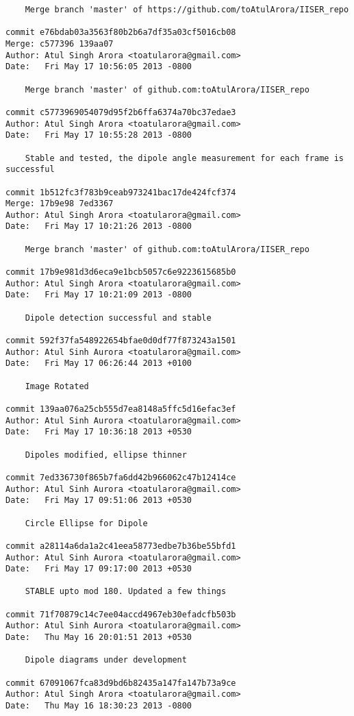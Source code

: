 \begin{lstlisting}
    Merge branch 'master' of https://github.com/toAtulArora/IISER_repo

commit e76bdab03a3563f80b2b6a7df35a03cf5016cb08
Merge: c577396 139aa07
Author: Atul Singh Arora <toatularora@gmail.com>
Date:   Fri May 17 10:56:05 2013 -0800

    Merge branch 'master' of github.com:toAtulArora/IISER_repo

commit c5773969054079d95f2b6ffa6374a70bc37edae3
Author: Atul Singh Arora <toatularora@gmail.com>
Date:   Fri May 17 10:55:28 2013 -0800

    Stable and tested, the dipole angle measurement for each frame is successful

commit 1b512fc3f783b9ceab973241bac17de424fcf374
Merge: 17b9e98 7ed3367
Author: Atul Singh Arora <toatularora@gmail.com>
Date:   Fri May 17 10:21:26 2013 -0800

    Merge branch 'master' of github.com:toAtulArora/IISER_repo

commit 17b9e981d3d6eca9e1bcb5057c6e9223615685b0
Author: Atul Singh Arora <toatularora@gmail.com>
Date:   Fri May 17 10:21:09 2013 -0800

    Dipole detection successful and stable

commit 592f37fa548922654bfae0d0df77f873243a1501
Author: Atul Sinh Aurora <toatularora@gmail.com>
Date:   Fri May 17 06:26:44 2013 +0100

    Image Rotated

commit 139aa076a25cb555d7ea8148a5ffc5d16efac3ef
Author: Atul Sinh Aurora <toatularora@gmail.com>
Date:   Fri May 17 10:36:18 2013 +0530

    Dipoles modified, ellipse thinner

commit 7ed336730f865b7fa6dd42b966062c47b12414ce
Author: Atul Sinh Aurora <toatularora@gmail.com>
Date:   Fri May 17 09:51:06 2013 +0530

    Circle Ellipse for Dipole

commit a28114a6da1a2c41eea58773edbe7b36be55bfd1
Author: Atul Sinh Aurora <toatularora@gmail.com>
Date:   Fri May 17 09:17:00 2013 +0530

    STABLE upto mod 180. Updated a few things

commit 71f70879c14c7ee04accd4967eb30efadcfb503b
Author: Atul Sinh Aurora <toatularora@gmail.com>
Date:   Thu May 16 20:01:51 2013 +0530

    Dipole diagrams under development

commit 67091067fca83d9bd6b82435a147fa147b73a9ce
Author: Atul Singh Arora <toatularora@gmail.com>
Date:   Thu May 16 18:30:23 2013 -0800


\end{lstlisting}
